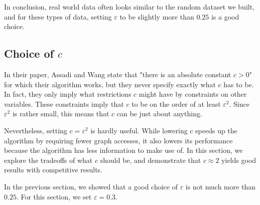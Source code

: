 \documentclass[
]{article}
\begin{document}
In conclusion, real world data often looks similar to the random dataset
we built, and for these types of data, setting {\(\varepsilon\)} to be
slightly more than {\(0.25\)} is a good choice.

\hypertarget{choice-of-c}{%
\subsection{\texorpdfstring{Choice of
{\(c\)}}{Choice of c}}\label{choice-of-c}}

In their paper, Assadi and Wang state that "there is an absolute
constant {\(c > 0\)}" for which their algorithm works, but they never
specify exactly what {\(c\)} has to be. In fact, they only imply what
restrictions {\(c\)} might have by constraints on other variables. These
constraints imply that {\(c\)} to be on the order of at least
{\(\varepsilon^{2}\)}. Since {\(\varepsilon^{2}\)} is rather small, this
means that {\(c\)} can be just about anything.

Nevertheless, setting {\(c = \varepsilon^{2}\)} is hardly useful. While
lowering {\(c\)} speeds up the algorithm by requiring fewer graph
accesses, it also lowers its performance because the algorithm has less
information to make use of. In this section, we explore the tradeoffs of
what {\(c\)} should be, and demonstrate that {\(c \approx 2\)} yields
good results with competitive results.

In the previous section, we showed that a good choice of
{\(\varepsilon\)} is not much more than {\(0.25\)}. For this section, we
set {\(\varepsilon = 0.3\)}.
\end{document}
